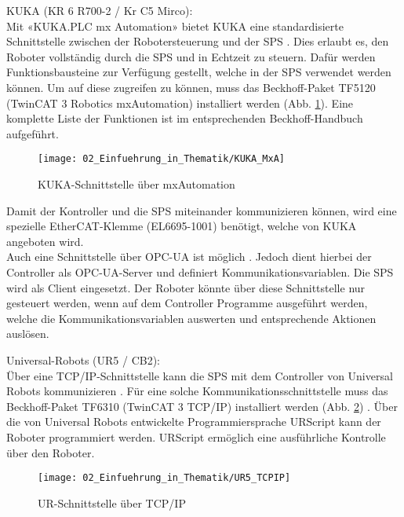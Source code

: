 		KUKA (KR 6 R700-2 / Kr C5 Mirco):
		\vspace{2mm}
		\\
		Mit «KUKA.PLC mx Automation» bietet KUKA eine standardisierte Schnittstelle zwischen der Robotersteuerung und der \Gls{SPS} \cite{MX_Automation}. Dies erlaubt es, den Roboter vollständig durch die \Gls{SPS} und in Echtzeit zu steuern. Dafür werden Funktionsbausteine zur Verfügung gestellt, welche in der \Gls{SPS} verwendet werden können. Um auf diese zugreifen zu können, muss das Beckhoff-Paket TF5120 (TwinCAT 3 Robotics mxAutomation) installiert werden (Abb. \ref{fig:KUKA_mxA}). Eine komplette Liste der Funktionen ist im entsprechenden Beckhoff-Handbuch aufgeführt.
		
		\begin{figure}[h!]
			\centering
			\texttt{[image: 02\_Einfuehrung\_in\_Thematik/KUKA\_MxA]}
			\captionsetup{justification=centering}
			\caption{KUKA-Schnittstelle über mxAutomation}
			\label{fig:KUKA_mxA}
		\end{figure}
		
		\newpage
		
		Damit der Kontroller und die \Gls{SPS} miteinander kommunizieren können, wird eine spezielle EtherCAT-Klemme (EL6695-1001) benötigt, welche von KUKA angeboten wird. 
		\\
		Auch eine Schnittstelle über OPC-UA ist möglich \cite{KUKA-OPCUA}. Jedoch dient hierbei der Controller als OPC-UA-Server und definiert Kommunikationsvariablen. Die \Gls{SPS} wird als Client eingesetzt. Der Roboter könnte über diese Schnittstelle nur gesteuert werden, wenn auf dem Controller Programme ausgeführt werden, welche die Kommunikationsvariablen auswerten und entsprechende Aktionen auslösen. 
		\vspace{3mm}
		
		Universal-Robots (UR5 / CB2):
		\vspace{2mm}
		\\
		Über eine TCP/IP-Schnittstelle kann die \Gls{SPS} mit dem Controller von Universal Robots kommunizieren \cite{UR5}. Für eine solche Kommunikationsschnittstelle muss das Beckhoff-Paket TF6310 (TwinCAT 3 TCP/IP) installiert werden (Abb. \ref{fig:UR_TCPIP}) \cite{TF6310}. Über die von Universal Robots entwickelte Programmiersprache URScript kann der Roboter programmiert werden. URScript ermöglich eine ausführliche Kontrolle über den Roboter.
		
		\begin{figure}[h!]
			\centering
			\texttt{[image: 02\_Einfuehrung\_in\_Thematik/UR5\_TCPIP]}
			\captionsetup{justification=centering}
			\caption{UR-Schnittstelle über TCP/IP}
			\label{fig:UR_TCPIP}
		\end{figure}
	
